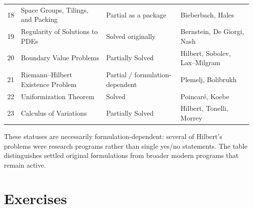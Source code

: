 \begin{center}
\begin{tabular}{c >{\raggedright\arraybackslash}p{3.8cm} >{\raggedright\arraybackslash}p{2.5cm} >{\raggedright\arraybackslash}p{3.8cm}}
18 & Space Groups, Tilings, and Packing & Partial as a package & Bieberbach, Hales \\
19 & Regularity of Solutions to PDEs & Solved originally & Bernstein, De Giorgi, Nash \\
20 & Boundary Value Problems & Partially Solved & Hilbert, Sobolev, Lax--Milgram \\
21 & Riemann--Hilbert Existence Problem & Partial / formulation-dependent & Plemelj, Bolibrukh \\
22 & Uniformization Theorem & Solved & Poincar\'e, Koebe \\
23 & Calculus of Variations & Partially Solved & Hilbert, Tonelli, Morrey \\
\bottomrule
\end{tabular}
\end{center}

\vspace{1em}

\noindent These statuses are necessarily formulation-dependent: several of Hilbert's problems were research programs rather than single yes/no statements. The table distinguishes settled original formulations from broader modern programs that remain active.

\section*{Exercises}

